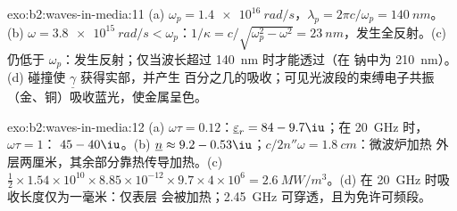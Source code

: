 \begin{solution}{exo:b2:waves-in-media:11}
(a) $\omega_p = \qty{1.4e16}{rad/s}$，$\lambda_p = 2\pi c/\omega_p = \qty{140}{nm}$。(b) $\omega = \qty{3.8e15}{rad/s}
< \omega_p$：$1/\kappa = c/\sqrt{\omega_p^2 - \omega^2} = \qty{23}{nm}$，发生全反射。(c)
仍低于 $\omega_p$：发生反射；仅当波长超过 \qty{140}{nm} 时才能透过（在
钠中为 \qty{210}{nm}）。(d) 碰撞使 $\underline\gamma$ 获得实部，并产生
百分之几的吸收；可见光波段的束缚电子共振
（金、铜）吸收蓝光，使金属呈色。
\end{solution}

\begin{solution}{exo:b2:waves-in-media:12}
(a) $\omega\tau = 0.12$：$\underline\varepsilon_r = 84 - 9.7\iu$；在 \qty{20}{GHz} 时，$\omega\tau = 1$：
$45 - 40\iu$。(b) $\underline n \approx 9.2 - 0.53\iu$；$c/2n''\omega = \qty{1.8}{cm}$：微波炉加热
外层两厘米，其余部分靠热传导加热。(c) $\tfrac12 \times
1.54 \times 10^{10} \times 8.85 \times 10^{-12} \times 9.7 \times 4 \times 10^6 = \qty{2.6}{MW/m^3}$。(d) 在
\qty{20}{GHz} 时吸收长度仅为一毫米：仅表层
会被加热；\qty{2.45}{GHz} 可穿透，且为免许可频段。
\end{solution}

